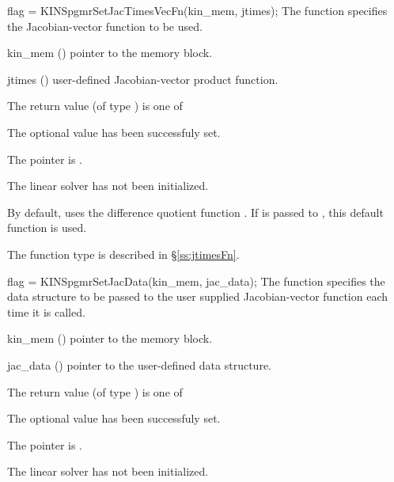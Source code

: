 {}
{
  flag = KINSpgmrSetJacTimesVecFn(kin\_mem, jtimes);
}
{
  The function  specifies the Jacobian-vector 
  function to be used.
}
{
  \begin{args}
  \item[kin\_mem] ()
    pointer to the {\kinsol} memory block.
  \item[jtimes] ()
    user-defined Jacobian-vector product function.
  \end{args}
}
{
  The return value  (of type ) is one of
  \begin{args}
  \item[\Id{KINSPGMR\_SUCCESS}] 
    The optional value has been successfuly set.
  \item[\Id{KINSPGMR\_MEM\_NULL}]
    The  pointer is .
  \item[\Id{KINSPGMR\_LMEM\_NULL}]
    The {\kinspgmr} linear solver has not been initialized.
  \end{args}
}
{
  By default, {\kinspgmr} uses the difference quotient function .
  If  is passed to , this default function is used.

  The function type  is described in \S\ref{ss:jtimesFn}.
}
{
  flag = KINSpgmrSetJacData(kin\_mem, jac\_data);
}
{
  The function  specifies the data structure
  to be passed to the user supplied Jacobian-vector
  function each time it is called.
}
{
  \begin{args}
  \item[kin\_mem] ()
    pointer to the {\kinsol} memory block.
  \item[jac\_data] ()
     pointer to the user-defined data structure.
  \end{args}
}
{
  The return value  (of type ) is one of
  \begin{args}
  \item[\Id{KINSPGMR\_SUCCESS}] 
    The optional value has been successfuly set.
  \item[\Id{KINSPGMR\_MEM\_NULL}]
    The  pointer is .
  \item[\Id{KINSPGMR\_LMEM\_NULL}]
    The {\kinspgmr} linear solver has not been initialized.
  \end{args}
}
{}



